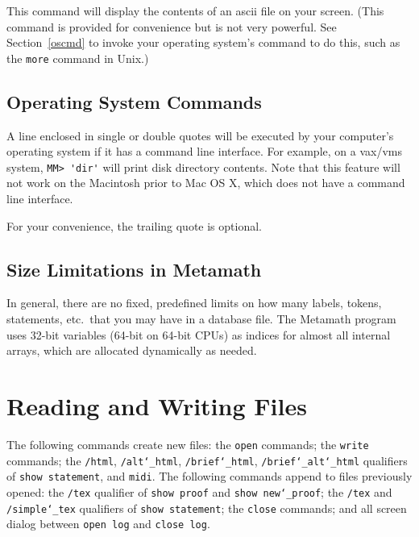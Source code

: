 This command will display the contents of an {\sc ascii} file on your
screen.  (This command is provided for convenience but is not very
powerful.  See Section~\ref{oscmd} to invoke your operating system's
command to do this, such as the \texttt{more} command in Unix.)

\subsection{Operating System Commands}\label{oscmd}

A line enclosed in single or double quotes will be executed by your
computer's operating system if it has a command line interface.  For
example, on a {\sc vax/vms} system,
\verb/MM> 'dir'/
will print disk directory contents.  Note that this feature will not
work on the Macintosh prior to Mac OS X, which does not have a command
line interface.

For your convenience, the trailing quote is optional.

\subsection{Size Limitations in Metamath}

In general, there are no fixed, predefined limits on how many labels, tokens, statements, etc.\ that
you may have in a database file.  The Metamath program uses 32-bit
variables (64-bit on 64-bit CPUs) as indices for almost all internal
arrays, which are allocated dynamically as needed.



\section{Reading and Writing Files}

The following commands create new files:  the \texttt{open} commands;
the \texttt{write} commands; the \texttt{/html},
\texttt{/alt{\char`\_}html}, \texttt{/brief{\char`\_}html},
\texttt{/brief{\char`\_}alt{\char`\_}html} qualifiers of \texttt{show
statement}, and \texttt{midi}.  The following commands append to files
previously opened:  the \texttt{/tex} qualifier of \texttt{show proof}
and \texttt{show new{\char`\_}proof}; the \texttt{/tex} and
\texttt{/simple{\char`\_}tex} qualifiers of \texttt{show statement}; the
\texttt{close} commands; and all screen dialog between \texttt{open log}
and \texttt{close log}.

